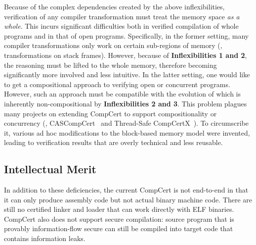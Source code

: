 Because of the complex dependencies created by the above
inflexibilities, verification of any compiler transformation must
treat the memory space \emph{as a whole}. This incurs significant
difficulties both in verified compilation of whole programs and in
that of open programs. Specifically, in the former setting, many
compiler transformations only work on certain sub-regions of memory
(\eg, transformations on stack frames). However, because of
\textbf{Inflexibilities 1 and 2}, the reasoning must be lifted to the
whole memory, therefore becoming significantly more involved and less
intuitive. In the latter setting, one would like to get a
compositional approach to verifying open or concurrent
programs. However, such an approach must be compatible with the
evolution of \nextblock which is inherently non-compositional by
\textbf{Inflexibilities 2 and 3}. This problem plagues many projects on
extending CompCert to support compositionality or concurrency (\eg,
CASCompCert~\cite{cascompcert} and Thread-Safe
CompCertX~\cite{ccal18}). To circumscribe it, various ad hoc
modifications to the block-based memory model were invented, leading to
verification results that are overly technical and less reusable.

\subsection{Intellectual Merit}
\label{ssec:intro-itm}

In addition to these deficiencies, the current CompCert is not end-to-end
in that it can only produce assembly code but not actual binary
machine code. There are still no certified linker and loader that can
work directly with ELF binaries.  CompCert also does not support secure
compilation: source program that is provably information-flow secure
can still be compiled into target code that contains information leaks.

